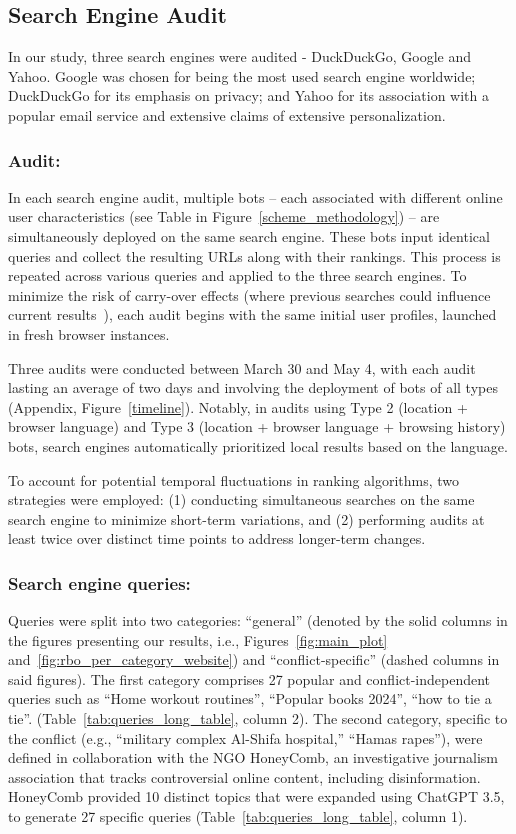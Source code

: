 \subsection{Search Engine Audit} 
In our study, three search engines were audited - DuckDuckGo, Google and Yahoo. Google was chosen for being the most used search engine worldwide; DuckDuckGo for its emphasis on privacy; and Yahoo for its association with a popular email service and extensive claims of extensive personalization.  

\subsubsection{Audit:} In each search engine audit, multiple bots -- each associated with different online user characteristics (see Table in Figure~\ref{scheme_methodology}) -- are simultaneously deployed on the same search engine. These bots input identical queries and collect the resulting URLs along with their rankings. This process is repeated across various queries and applied to the three search engines. To minimize the risk of carry-over effects (where previous searches could influence current results~\cite{personalization_web_search}), each audit begins with the same initial user profiles, launched in fresh browser instances.

Three audits were conducted between March 30 and May 4, with each audit lasting an average of two days and involving the deployment of bots of all types (Appendix, Figure~\ref{timeline}). Notably, in audits using Type 2 (location + browser language) and Type 3 (location + browser language + browsing history) bots, search engines automatically prioritized local results based on the language. 

To account for potential temporal fluctuations in ranking algorithms, two strategies were employed: (1) conducting simultaneous searches on the same search engine to minimize short-term variations, and (2) performing audits at least twice over distinct time points to address longer-term changes. 

\subsubsection{Search engine queries:}
Queries were split into two categories: ``general'' (denoted by the solid columns in the figures presenting our results, i.e., Figures~\ref{fig:main_plot} and~\ref{fig:rbo_per_category_website}) and ``conflict-specific'' (dashed columns in said figures). The first category comprises 27 popular and conflict-independent queries such as ``Home workout routines'', ``Popular books 2024'', ``how to tie a tie''. (Table~\ref{tab:queries_long_table}, column 2). 
The second category, specific to the conflict (e.g., ``military complex Al-Shifa hospital,'' ``Hamas rapes''), were defined in collaboration with the NGO HoneyComb, an investigative journalism association that tracks controversial online content, including disinformation. HoneyComb provided 10 distinct topics that were expanded using ChatGPT 3.5, to generate 27 specific queries (Table~\ref{tab:queries_long_table}, column 1).

